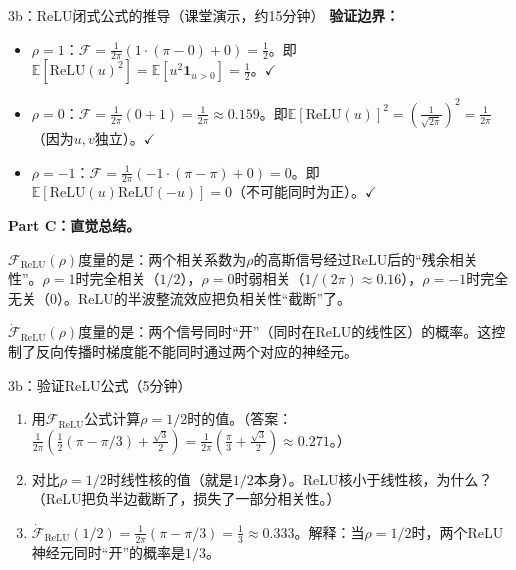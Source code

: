 \documentclass[11pt,a4paper]{article}
\newcommand{\E}{\mathbb{E}}
\begin{document}
\begin{handcalc}{3b：ReLU闭式公式的推导（课堂演示，约15分钟）}
\medskip
\textbf{验证边界：}
\begin{itemize}[leftmargin=*]
\item $\rho=1$：$\mathcal{F}=\frac{1}{2\pi}(1\cdot(\pi-0)+0)=\frac{1}{2}$。即$\E[\text{ReLU}(u)^2]=\E[u^2\mathbf{1}_{u>0}]=\frac{1}{2}$。$\checkmark$
\item $\rho=0$：$\mathcal{F}=\frac{1}{2\pi}(0+1)=\frac{1}{2\pi}\approx 0.159$。即$\E[\text{ReLU}(u)]^2=(\frac{1}{\sqrt{2\pi}})^2=\frac{1}{2\pi}$（因为$u,v$独立）。$\checkmark$
\item $\rho=-1$：$\mathcal{F}=\frac{1}{2\pi}(-1\cdot(\pi-\pi)+0)=0$。即$\E[\text{ReLU}(u)\text{ReLU}(-u)]=0$（不可能同时为正）。$\checkmark$
\end{itemize}

\medskip
\textbf{Part C：直觉总结。}

$\mathcal{F}_{\text{ReLU}}(\rho)$度量的是：两个相关系数为$\rho$的高斯信号经过ReLU后的``残余相关性''。$\rho=1$时完全相关（$1/2$），$\rho=0$时弱相关（$1/(2\pi)\approx 0.16$），$\rho=-1$时完全无关（$0$）。ReLU的半波整流效应把负相关性``截断''了。

$\dot{\mathcal{F}}_{\text{ReLU}}(\rho)$度量的是：两个信号同时``开''（同时在ReLU的线性区）的概率。这控制了反向传播时梯度能不能同时通过两个对应的神经元。
\end{handcalc}

\begin{classexercise}{3b：验证ReLU公式（5分钟）}
\begin{enumerate}[label=(\alph*)]
\item 用$\mathcal{F}_{\text{ReLU}}$公式计算$\rho=1/2$时的值。（答案：$\frac{1}{2\pi}(\frac{1}{2}(\pi-\pi/3)+\frac{\sqrt{3}}{2})=\frac{1}{2\pi}(\frac{\pi}{3}+\frac{\sqrt{3}}{2})\approx 0.271$。）
\item 对比$\rho=1/2$时线性核的值（就是$1/2$本身）。ReLU核小于线性核，为什么？（ReLU把负半边截断了，损失了一部分相关性。）
\item $\dot{\mathcal{F}}_{\text{ReLU}}(1/2)=\frac{1}{2\pi}(\pi-\pi/3)=\frac{1}{3}\approx 0.333$。解释：当$\rho=1/2$时，两个ReLU神经元同时``开''的概率是$1/3$。
\end{enumerate}
\end{classexercise}
\end{document}
